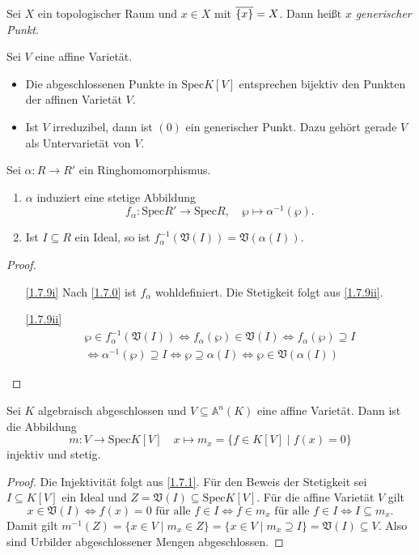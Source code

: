 \documentclass[a4paper,12pt]{scrbook}
\newtheorem{proof}{Beweis}
\def\A{\mathbb{A}}
\def\V{\mathfrak{V}}
\newcommand{\Spec}{\mathrm{Spec}}
\newcommand{\ra}{\longrightarrow}
\renewcommand{\mapsto}{\longmapsto}
\def\Bar#1{\ensuremath\overline{#1}}
\begin{document}
\begin{bem}\label{1.7.7}
  Sei $X$ ein topologischer Raum und $x\in X$ mit $\Bar{\{x\}}=X$. Dann heißt $x$ \emph{generischer Punkt}.
\end{bem}

\begin{bsp}\label{1.7.8}
  Sei $V$ eine affine Varietät.
  \begin{itemize}
  \item Die abgeschlossenen Punkte in $\Spec K[V]$ entsprechen bijektiv den Punkten der affinen Varietät $V$.
  \item Ist $V$ irreduzibel, dann ist $(0)$ ein generischer Punkt. Dazu gehört gerade $V$ als Untervarietät von $V$.
  \end{itemize}
\end{bsp}


\begin{bem}\label{1.7.9}
  Sei $\alpha\colon R\ra R'$ ein Ringhomomorphismus.
  \begin{enumerate}
  \item{} $\alpha$ induziert eine stetige Abbildung \[ f_\alpha\colon \Spec R'\ra\Spec R,\quad
    \wp\mapsto\alpha^{-1}(\wp). \]
  \item{} Ist $I\subseteq R$ ein Ideal, so ist $f_\alpha^{-1}(\V(I))=\V(\alpha(I))$.
  \end{enumerate}
\end{bem}
\begin{proof}
  \begin{enumerate}
  \item[\ref{1.7.9i}] Nach \cref{1.7.0} ist $f_\alpha$ wohldefiniert. Die Stetigkeit folgt aus \ref{1.7.9ii}.
  \item[\ref{1.7.9ii}]
    \begin{multline*}
      \wp\in f_\alpha^{-1}(\V(I)) \iff f_\alpha(\wp)\in\V(I) \iff f_\alpha(\wp)\supseteq I \\
      \iff \alpha^{-1}(\wp)\supseteq I \iff \wp\supseteq\alpha(I) \iff \wp\in\V(\alpha(I))
    \end{multline*}
  \end{enumerate}
\end{proof}

\begin{prop}\label{1.7.10}
  Sei $K$ algebraisch abgeschlossen und $V\subseteq\A^n(K)$ eine affine Varietät. Dann ist die Abbildung
  \[ m\colon V\ra \Spec K[V] \quad x\mapsto m_x=\{f\in K[V]\mid f(x)=0\} \]
  injektiv und stetig.
\end{prop}
\begin{proof}
  Die Injektivität folgt aus \cref{1.7.1}. Für den Beweis der Stetigkeit sei $I\subseteq K[V]$ ein Ideal und
  $Z=\V(I)\subseteq\Spec K[V]$. Für die affine
  Varietät $V$ gilt
  \[x\in\V(I) \iff f(x)=0 \text{ für alle }f\in I \iff f\in m_x \text{ für alle }f\in I \iff I\subseteq m_x. \]
  Damit gilt $m^{-1}(Z)=\{x\in V\mid m_x\in Z\}=\{x\in V\mid m_x\supseteq I\}=\V(I)\subseteq V$. Also sind Urbilder
  abgeschlossener Mengen abgeschlossen.
\end{proof}
\end{document}
